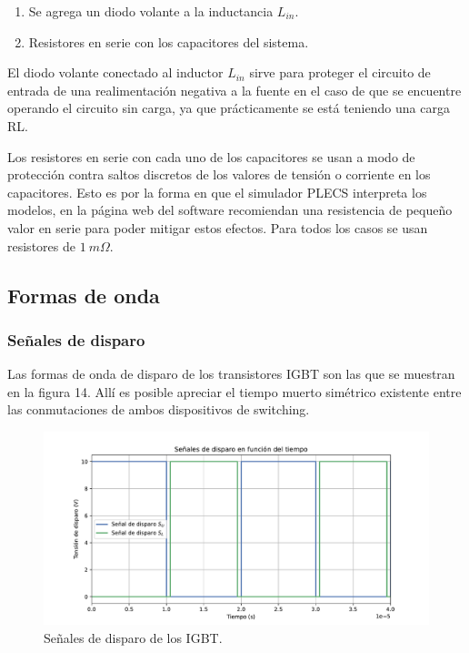 \begin{enumerate}
	\item Se agrega un diodo volante a la inductancia $L_{in}$.
	\item Resistores en serie con los capacitores del sistema.
\end{enumerate}

El diodo volante conectado al inductor $L_{in}$ sirve para proteger el circuito de entrada de una realimentación negativa a la fuente en el caso de que se encuentre operando el circuito sin carga, ya que prácticamente se está teniendo una carga RL.

Los resistores en serie con cada uno de los capacitores se usan a modo de protección contra saltos discretos de los valores de tensión o corriente en los capacitores. Esto es por la forma en que el simulador PLECS interpreta los modelos, en la página web del software recomiendan una resistencia de pequeño valor en serie para poder mitigar estos efectos. Para todos los casos se usan resistores de $1 \ m\Omega$.

\subsection{Formas de onda}

\subsubsection{Señales de disparo}

Las formas de onda de disparo de los transistores IGBT son las que se muestran en la figura 14. Allí es posible apreciar el tiempo muerto simétrico existente entre las conmutaciones de ambos dispositivos de switching.

\begin{figure}
	\centering
	\includegraphics[width=1\linewidth]{img/disparo}
	\caption{Señales de disparo de los IGBT.}
	\label{fig:disparo}
\end{figure}


